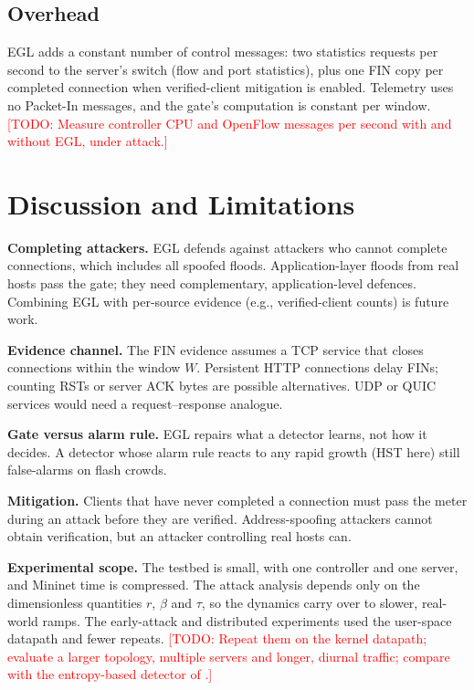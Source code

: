 \documentclass[conference]{IEEEtran}
\newcommand{\TODO}[1]{\textcolor{red}{[TODO: #1]}}
\begin{document}
\subsection{Overhead}
EGL adds a constant number of control messages: two statistics requests per second to the server's switch (flow and port statistics), plus one FIN copy per completed connection when verified-client mitigation is enabled. Telemetry uses no Packet-In messages, and the gate's computation is constant per window. \TODO{Measure controller CPU and OpenFlow messages per second with and without EGL, under attack.}

\section{Discussion and Limitations}\label{sec:discussion}
\textbf{Completing attackers.} EGL defends against attackers who cannot complete connections, which includes all spoofed floods. Application-layer floods from real hosts pass the gate; they need complementary, application-level defences. Combining EGL with per-source evidence (e.g., verified-client counts) is future work.

\textbf{Evidence channel.} The FIN evidence assumes a TCP service that closes connections within the window $W$. Persistent HTTP connections delay FINs; counting RSTs or server ACK bytes are possible alternatives. UDP or QUIC services would need a request--response analogue.

\textbf{Gate versus alarm rule.} EGL repairs what a detector learns, not how it decides. A detector whose alarm rule reacts to any rapid growth (HST here) still false-alarms on flash crowds.

\textbf{Mitigation.} Clients that have never completed a connection must pass the meter during an attack before they are verified. Address-spoofing attackers cannot obtain verification, but an attacker controlling real hosts can.

\textbf{Experimental scope.} The testbed is small, with one controller and one server, and Mininet time is compressed. The attack analysis depends only on the dimensionless quantities $r$, $\beta$ and $\tau$, so the dynamics carry over to slower, real-world ramps. The early-attack and distributed experiments used the user-space datapath and fewer repeats. \TODO{Repeat them on the kernel datapath; evaluate a larger topology, multiple servers and longer, diurnal traffic; compare with the entropy-based detector of \cite{zhang2026time}.}
\end{document}
